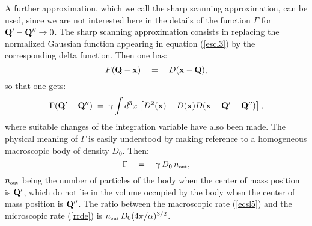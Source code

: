 \documentclass[10pt,a4paper]{article}
\begin{document}
A further approximation, which we call the sharp scanning
approximation, can be used, since we are not interested here in
the details of the function $\Gamma$ for ${\bf Q}' - {\bf Q}''
\rightarrow 0$. The sharp scanning approximation consists in
replacing the normalized Gaussian function appearing in equation
(\ref{escl3}) by the corresponding delta function. Then one has:
\begin{equation}
F({\bf Q} - {\bf x}) \quad = \quad D({\bf x} - {\bf Q}),
\end{equation}
so that one gets:
\begin{equation} \label{gss}
\Gamma ({\bf Q}' - {\bf Q}'') \; = \; \gamma \int d^{3} x\, \left[
D^{2}({\bf x}) - D({\bf x}) D({\bf x} + {\bf Q}' - {\bf Q}'')
\right],
\end{equation}
where suitable changes of the integration variable have also been
made. The physical meaning of $\Gamma$ is easily understood by
making reference to a homogeneous macroscopic body of density
$D_{0}$. Then:
\begin{equation} \label{ecsl5}
\Gamma \quad = \quad \gamma\, D_{0}\, n_{\makebox{\tiny out}},
\end{equation}
$n_{\makebox{\tiny out}}$ being the number of particles of the
body when the center of mass position is ${\bf Q}'$, which do not
lie in the volume occupied by the body when the center of mass
position is ${\bf Q}''$. The ratio between the macroscopic rate
(\ref{ecsl5}) and the microscopic rate (\ref{rrde}) is
$n_{\makebox{\tiny out}}\, D_{0} ( 4\pi /\alpha)^{3/2}$.
\end{document}
